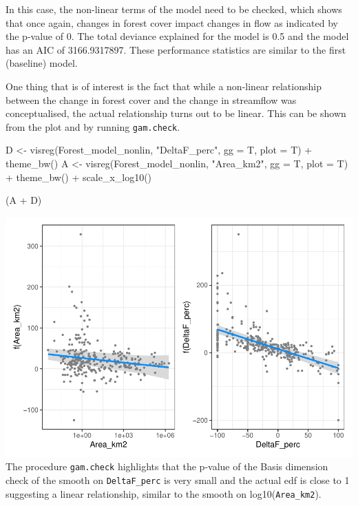 \documentclass[]{elsarticle} %
\newenvironment{Shaded}{\begin{snugshade}}{\end{snugshade}}
\newcommand{\AttributeTok}[1]{\textcolor[rgb]{0.77,0.63,0.00}{#1}}
\newcommand{\FunctionTok}[1]{\textcolor[rgb]{0.00,0.00,0.00}{#1}}
\newcommand{\NormalTok}[1]{#1}
\newcommand{\OtherTok}[1]{\textcolor[rgb]{0.56,0.35,0.01}{#1}}
\newcommand{\SpecialCharTok}[1]{\textcolor[rgb]{0.00,0.00,0.00}{#1}}
\newcommand{\StringTok}[1]{\textcolor[rgb]{0.31,0.60,0.02}{#1}}
\begin{document}
In this case, the non-linear terms of the model need to be checked, which shows that once again, changes in forest cover impact changes in flow as indicated by the p-value of 0. The total deviance explained for the model is 0.5 and the model has an AIC of 3166.9317897. These performance statistics are similar to the first (baseline) model.

One thing that is of interest is the fact that while a non-linear relationship between the change in forest cover and the change in streamflow was conceptualised, the actual relationship turns out to be linear. This can be shown from the plot and by running \texttt{gam.check}.

\begin{Shaded}
\begin{Highlighting}[]
\NormalTok{D }\OtherTok{\textless{}{-}} \FunctionTok{visreg}\NormalTok{(Forest\_model\_nonlin, }\StringTok{"DeltaF\_perc"}\NormalTok{, }\AttributeTok{gg =}\NormalTok{ T, }\AttributeTok{plot =}\NormalTok{ T) }\SpecialCharTok{+} \FunctionTok{theme\_bw}\NormalTok{()}
\NormalTok{A }\OtherTok{\textless{}{-}} \FunctionTok{visreg}\NormalTok{(Forest\_model\_nonlin, }\StringTok{"Area\_km2"}\NormalTok{, }\AttributeTok{gg =}\NormalTok{ T, }\AttributeTok{plot =}\NormalTok{ T) }\SpecialCharTok{+} \FunctionTok{theme\_bw}\NormalTok{() }\SpecialCharTok{+} 
  \FunctionTok{scale\_x\_log10}\NormalTok{()}

\NormalTok{(A }\SpecialCharTok{+}\NormalTok{ D)}
\end{Highlighting}
\end{Shaded}

\includegraphics{SupplementaryMaterialPart3_files/figure-latex/unnamed-chunk-10-1.pdf}
The procedure \texttt{gam.check} highlights that the p-value of the Basis dimension check of the smooth on \texttt{DeltaF\_perc} is very small and the actual edf is close to 1 suggesting a linear relationship, similar to the smooth on log10(\texttt{Area\_km2}).
\end{document}
